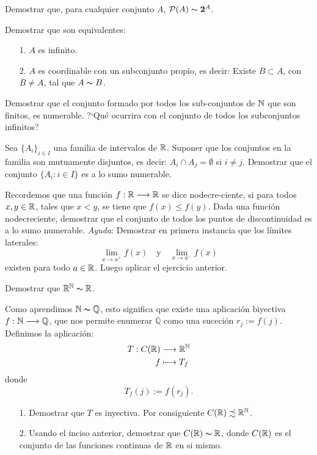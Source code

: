 \begin{ejercicio}\label{8} Demostrar que, para cualquier conjunto
$A$, $\mathcal{P}(A)\thicksim\mathbf{2}^A$.
\end{ejercicio}
\begin{ejercicio}\label{infcoordconsub} Demostrar que son
equivalentes:
\begin{itemize}
     \item[1.] $A$ es infinito.
     \item[2.] $A$ es coordinable con un subconjunto propio, es
     decir: Existe $B\subset A$, con $B\neq A$, tal que
     $A\thicksim B$.
\end{itemize}
\end{ejercicio}
\begin{ejercicio} Demostrar que el conjunto formado por todos los
sub-\newline conjuntos de $\mathbb{N}$ que son finitos, es numerable.
?`Qué ocurrira con el conjunto de todos los subconjuntos
infinitos?
\end{ejercicio}
\begin{ejercicio} Sea $\{A_i\}_{i\in I}$ una familia de intervalos
de $\mathbb{R}$. Suponer que los conjuntos en la familia son mutuamente
disjuntos, es decir: $A_i\cap A_j=\emptyset$ si $i\neq j$.
Demostrar que el conjunto $\{A_i:i\in I\}$ es a lo sumo numerable.
\end{ejercicio}
\begin{ejercicio} Recordemos que una función
$f:\mathbb{R}\longrightarrow\mathbb{R}$ se dice nodecre-\newline ciente, si para
todos $x,y\in\mathbb{R}$, tales que $x<y$, se tiene que $f(x)\leq f(y)$.
Dada una función nodecreciente, demostrar que el conjunto de
todos los puntos de discontinuidad es a lo sumo numerable.
\textit{Ayuda}: Demostrar en primera instancia que los
límites laterales:
\[
    \lim\limits_{x\rightarrow a^+}f(x)\quad\text{y}\quad \lim\limits_{x\rightarrow
    a^-}f(x)
\]
existen para todo $a\in\mathbb{R}$. Luego aplicar el ejercicio anterior.
\end{ejercicio}
\begin{ejercicio} Demostrar que $\mathbb{R}^{\mathbb{N}}\thicksim\mathbb{R}$.
\end{ejercicio}
\begin{ejercicio} Como aprendimos $\mathbb{N}\thicksim\mathbb{Q}$, esto
significa que existe una aplicación biyectiva
$f:\mathbb{N}\longrightarrow\mathbb{Q}$, que nos permite enumerar
$\mathbb{Q}$ como una suceción $r_j:=f(j)$. Definimos la
aplicación:
\[\begin{split}
              T:C(\mathbb{R})&\longrightarrow \mathbb{R}^{\mathbb{N}}\\
              f        &\longmapsto T_f\\
\end{split}\]
donde
\[
  T_f(j):=f(r_j).
\]
\begin{itemize}
   \item [1.] Demostrar que $T$ es inyectiva. Por consiguiente
   $C(\mathbb{R})\precsim\mathbb{R}^{\mathbb{N}}$.
   \item[2.] Usando el inciso anterior, demostrar que
    $C(\mathbb{R})\thicksim\mathbb{R}$, donde $C(\mathbb{R})$ es el conjunto
    de las funciones continuas de $\mathbb{R}$ en si mismo.
\end{itemize}
\end{ejercicio}
